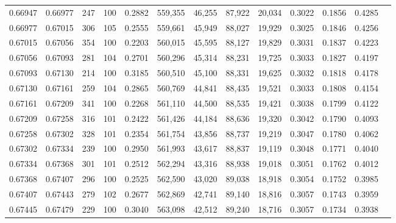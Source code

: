 \begin{tabular}{rrrrrrrrrrrrr}
0.66947 & 0.66977 &   247 & 100 &                                     0.2882 & 559,355 &  46,255 &  87,922 &  20,034 & 0.3022 & 0.1856 & 0.4285 \\
0.66977 & 0.67015 &   306 & 105 &                                     0.2555 & 559,661 &  45,949 &  88,027 &  19,929 & 0.3025 & 0.1846 & 0.4256 \\
0.67015 & 0.67056 &   354 & 100 &                                     0.2203 & 560,015 &  45,595 &  88,127 &  19,829 & 0.3031 & 0.1837 & 0.4223 \\
0.67056 & 0.67093 &   281 & 104 &                                     0.2701 & 560,296 &  45,314 &  88,231 &  19,725 & 0.3033 & 0.1827 & 0.4197 \\
0.67093 & 0.67130 &   214 & 100 &                                     0.3185 & 560,510 &  45,100 &  88,331 &  19,625 & 0.3032 & 0.1818 & 0.4178 \\
0.67130 & 0.67161 &   259 & 104 &                                     0.2865 & 560,769 &  44,841 &  88,435 &  19,521 & 0.3033 & 0.1808 & 0.4154 \\
0.67161 & 0.67209 &   341 & 100 &                                     0.2268 & 561,110 &  44,500 &  88,535 &  19,421 & 0.3038 & 0.1799 & 0.4122 \\
0.67209 & 0.67258 &   316 & 101 &                                     0.2422 & 561,426 &  44,184 &  88,636 &  19,320 & 0.3042 & 0.1790 & 0.4093 \\
0.67258 & 0.67302 &   328 & 101 &                                     0.2354 & 561,754 &  43,856 &  88,737 &  19,219 & 0.3047 & 0.1780 & 0.4062 \\
0.67302 & 0.67334 &   239 & 100 &                                     0.2950 & 561,993 &  43,617 &  88,837 &  19,119 & 0.3048 & 0.1771 & 0.4040 \\
0.67334 & 0.67368 &   301 & 101 &                                     0.2512 & 562,294 &  43,316 &  88,938 &  19,018 & 0.3051 & 0.1762 & 0.4012 \\
0.67368 & 0.67407 &   296 & 100 &                                     0.2525 & 562,590 &  43,020 &  89,038 &  18,918 & 0.3054 & 0.1752 & 0.3985 \\
0.67407 & 0.67443 &   279 & 102 &                                     0.2677 & 562,869 &  42,741 &  89,140 &  18,816 & 0.3057 & 0.1743 & 0.3959 \\
0.67445 & 0.67479 &   229 & 100 &                                     0.3040 & 563,098 &  42,512 &  89,240 &  18,716 & 0.3057 & 0.1734 & 0.3938 \\

\end{tabular}
